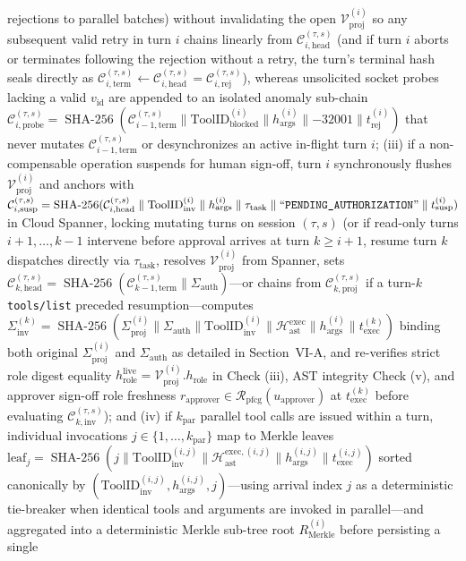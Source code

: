 \documentclass[conference,10pt]{IEEEtran}
\begin{document}
rejections to parallel batches) without invalidating the open $\mathcal{V}_{\text{proj}}^{(i)}$ so any subsequent valid retry in turn $i$ chains linearly from $\mathcal{C}_{i,\text{head}}^{(\tau,s)}$ (and if turn $i$ aborts or terminates following the rejection without a retry, the turn's terminal hash seals directly as $\mathcal{C}_{i,\text{term}}^{(\tau, s)} \leftarrow \mathcal{C}_{i,\text{head}}^{(\tau, s)} = \mathcal{C}_{i,\text{rej}}^{(\tau, s)}$), whereas unsolicited socket probes lacking a valid $v_{\text{id}}$ are appended to an isolated anomaly sub-chain $\mathcal{C}_{i,\text{probe}}^{(\tau,s)} = \operatorname{SHA-256}(\mathcal{C}_{i-1,\text{term}}^{(\tau, s)} \parallel \text{ToolID}_{\text{blocked}}^{(i)} \parallel h_{\text{args}}^{(i)} \parallel -32001 \parallel t_{\text{rej}}^{(i)})$ that never mutates $\mathcal{C}_{i-1,\text{term}}^{(\tau,s)}$ or desynchronizes an active in-flight turn $i$; (iii) if a non-compensable operation suspends for human sign-off, turn $i$ synchronously flushes $\mathcal{V}_{\text{proj}}^{(i)}$ and anchors with $\mathcal{C}_{i,\text{susp}}^{(\tau, s)} = \operatorname{SHA-256}(\mathcal{C}_{i,\text{head}}^{(\tau, s)} \parallel \text{ToolID}_{\text{inv}}^{(i)} \parallel h_{\text{args}}^{(i)} \parallel \tau_{\text{task}} \parallel \text{``\texttt{PENDING\_AUTHORIZATION}''} \parallel t_{\text{susp}}^{(i)})$ in Cloud Spanner, locking mutating turns on session $(\tau, s)$ (or if read-only turns $i+1, \dots, k-1$ intervene before approval arrives at turn $k \ge i+1$, resume turn $k$ dispatches directly via $\tau_{\text{task}}$, resolves $\mathcal{V}_{\text{proj}}^{(i)}$ from Spanner, sets $\mathcal{C}_{k,\text{head}}^{(\tau, s)} = \operatorname{SHA-256}(\mathcal{C}_{k-1,\text{term}}^{(\tau, s)} \parallel \Sigma_{\text{auth}})$—or chains from $\mathcal{C}_{k,\text{proj}}^{(\tau, s)}$ if a turn-$k$ \texttt{tools/list} preceded resumption—computes $\Sigma_{\text{inv}}^{(k)} = \operatorname{SHA-256}(\Sigma_{\text{proj}}^{(i)} \parallel \Sigma_{\text{auth}} \parallel \text{ToolID}_{\text{inv}}^{(i)} \parallel \mathcal{H}_{\text{ast}}^{\text{exec}} \parallel h_{\text{args}}^{(i)} \parallel t_{\text{exec}}^{(k)})$ binding both original $\Sigma_{\text{proj}}^{(i)}$ and $\Sigma_{\text{auth}}$ as detailed in Section~VI-A, and re-verifies strict role digest equality $h_{\text{role}}^{\text{live}} = \mathcal{V}_{\text{proj}}^{(i)}.h_{\text{role}}$ in Check (iii), AST integrity Check (v), and approver sign-off role freshness $r_{\text{approver}} \in \mathcal{R}_{\text{pfcg}}(u_{\text{approver}})$ at $t_{\text{exec}}^{(k)}$ before evaluating $\mathcal{C}_{k,\text{inv}}^{(\tau, s)}$); and (iv) if $k_{\text{par}}$ parallel tool calls are issued within a turn, individual invocations $j \in \{1, \dots, k_{\text{par}}\}$ map to Merkle leaves $\text{leaf}_j = \operatorname{SHA-256}(j \parallel \text{ToolID}_{\text{inv}}^{(i, j)} \parallel \mathcal{H}_{\text{ast}}^{\text{exec},(i, j)} \parallel h_{\text{args}}^{(i, j)} \parallel t_{\text{exec}}^{(i, j)})$ sorted canonically by $(\text{ToolID}_{\text{inv}}^{(i,j)}, h_{\text{args}}^{(i,j)}, j)$—using arrival index $j$ as a deterministic tie-breaker when identical tools and arguments are invoked in parallel—and aggregated into a deterministic Merkle sub-tree root $R_{\text{Merkle}}^{(i)}$ before persisting a single 
\end{document}
